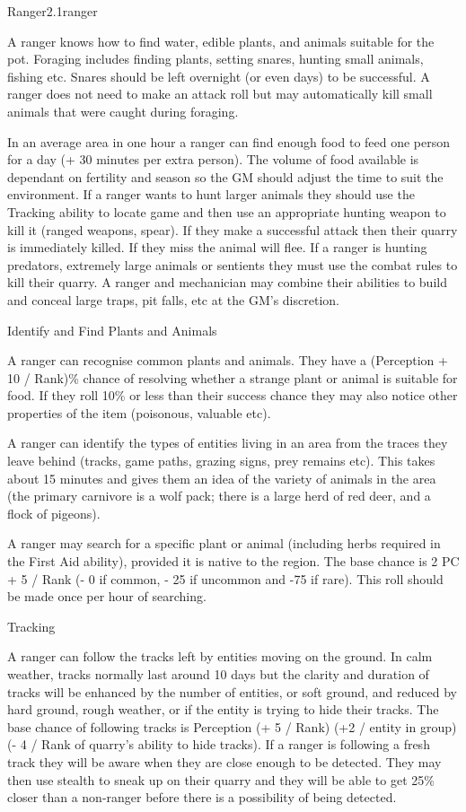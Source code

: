 \begin{skill}{Ranger}{2.1}{ranger}
\begin{Description}
A ranger knows how to find water, edible plants, and animals suitable
for the pot. Foraging includes finding plants, setting snares, hunting
small animals, fishing etc. Snares should be left overnight (or even
days) to be successful.  A ranger does not need to make an attack roll
but may automatically kill small animals that were caught during
foraging.

In an average area in one hour a ranger can find enough food to feed
one person for a day (+ 30 minutes per extra person).  The volume of
food available is dependant on fertility and season so the GM should
adjust the time to suit the environment.  If a ranger wants to hunt
larger animals they should use the Tracking ability to locate game and
then use an appropriate hunting weapon to kill it (\ie ranged weapons,
spear).  If they make a successful attack then their quarry is
immediately killed.  If they miss the animal will flee. If a ranger is
hunting predators, extremely large animals or sentients they must use
the combat rules to kill their quarry.  A ranger and mechanician may
combine their abilities to build and conceal large traps, pit falls,
etc at the GM's discretion.

\item[Identify and Find Plants and Animals]

A ranger can recognise common plants and animals.  They have a
(Perception + 10 / Rank)\% chance of resolving whether a strange plant
or animal is suitable for food. If they roll 10\% or less than their
success chance they may also notice other properties of the item
(\eg poisonous, valuable etc).

A ranger can identify the types of entities living in an area from the
traces they leave behind (tracks, game paths, grazing signs, prey
remains etc).  This takes about 15 minutes and gives them an idea of
the variety of animals in the area (\eg the primary carnivore is a
wolf pack; there is a large herd of red deer, and a flock of pigeons).

A ranger may search for a specific plant or animal (including herbs
required in the First Aid ability), provided it is native to the
region.  The base chance is 2 \x PC + 5 / Rank (- 0 if common, - 25 if
uncommon and -75 if rare).  This roll should be made once per hour
of searching.

\item[Tracking]

A ranger can follow the tracks left by entities moving on the ground.
In calm weather, tracks normally last around 10 days but the clarity
and duration of tracks will be enhanced by the number of entities, or
soft ground, and reduced by hard ground, rough weather, or if the
entity is trying to hide their tracks.  The base chance of following
tracks is Perception (+ 5 / Rank) (+2 / entity in group) (- 4 / Rank
of quarry's ability to hide tracks).  If a ranger is following a fresh
track they will be aware when they are close enough to be detected.
They may then use stealth to sneak up on their quarry and they will be
able to get 25\% closer than a non-ranger before there is a
possibility of being detected.
\end{Description}


\end{skill}
